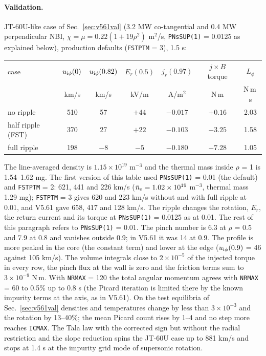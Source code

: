 \documentclass[11pt]{article}
\def\r#1{{\rm#1}}
\begin{document}
\paragraph{Validation.}  JT-60U-like case of Sec.~\ref{sec:v561val} (3.2 MW co-tangential and 0.4 MW
perpendicular NBI, $\chi=\mu=0.22(1+19\rho^2)$ m$^2$/s, \texttt{PNsSUP(1)} = 0.0125 as explained
below), production defaults (\texttt{FSTPTM} = 3), 1.5 s:
\begin{center}
\begin{tabular}{|l|c|c|c|c|c|c|}\hline
case & $u_{\r{i}\phi}(0)$ & $u_{\r{i}\phi}(0.82)$ & $E_r(0.5)$ & $j_r(0.97)$ & $j\times B$ torque & $L_\phi$ \\
 & km/s & km/s & kV/m & A/m$^2$ & N\,m & N\,m\,s \\\hline
no ripple & 510 & 57 & $+44$ & $-0.017$ & $+0.16$ & 2.03 \\
half ripple (FST) & 370 & 27 & $+22$ & $-0.103$ & $-3.25$ & 1.58 \\
full ripple & 198 & $-8$ & $-5$ & $-0.180$ & $-7.28$ & 1.05 \\\hline
\end{tabular}
\end{center}
The line-averaged density is $1.15\times10^{19}$ m$^{-3}$ and the thermal mass inside $\rho$ = 1 is 1.54--1.62 mg.
The first version of this table used \texttt{PNsSUP(1)} = 0.01 (the default) and \texttt{FSTPTM} = 2:
621, 441 and 226 km/s ($\bar n_\r{e} = 1.02\times10^{19}$ m$^{-3}$, thermal mass 1.29 mg);
\texttt{FSTPTM} = 3 gives 620 and 223 km/s without and with full ripple at 0.01, and V5.61 gave 658,
417 and 128 km/s.  The ripple changes the rotation, $E_r$, the return current and its torque at
\texttt{PNsSUP(1)} = 0.0125 as at 0.01.  The rest of this paragraph refers to
\texttt{PNsSUP(1)} = 0.01.  The pinch number is 6.3 at $\rho$ = 0.5 and 7.9 at
0.8 and vanishes outside 0.9; in V5.61 it was 14 at 0.9.  The profile is more peaked
in the core (the constant term) and lower at the edge ($u_{\r{i}\phi}(0.9)$ = 46
against 105 km/s).  The volume integrals close to $2\times10^{-5}$ of the injected
torque in every row, the pinch flux at the wall is zero and the friction terms sum to
$3\times10^{-9}$ N\,m.  With \texttt{NRMAX} = 120 the total angular momentum agrees
with \texttt{NRMAX} = 60 to 0.5\% up to 0.8 s (the Picard iteration is limited there by
the known impurity terms at the axis, as in V5.61).  On the test equilibria of
Sec.~\ref{sec:v561val} densities and temperatures change by less than $3\times10^{-3}$
and the rotation by 13--40\%; the mean Picard count rises by 1--4 and no step more
reaches \texttt{ICMAX}.  The Tala law with the corrected sign but without the radial
restriction and the slope reduction spins the JT-60U case up to 881 km/s and stops at
1.4 s at the impurity grid mode of supersonic rotation.
\end{document}
